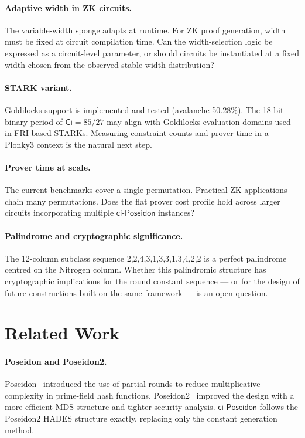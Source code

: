 \documentclass[preprint]{iacrtrans}
\newcommand{\Ci}{\ensuremath{\mathsf{Ci}}}
\newcommand{\ciposeidon}{\ensuremath{\mathsf{ci\text{-}Poseidon}}}
\begin{document}
\paragraph{Adaptive width in ZK circuits.}
The variable-width sponge adapts at runtime. For ZK proof generation, width
must be fixed at circuit compilation time. Can the width-selection logic be
expressed as a circuit-level parameter, or should circuits be instantiated
at a fixed width chosen from the observed stable width distribution?

\paragraph{STARK variant.}
Goldilocks support is implemented and tested (avalanche 50.28\%). The 18-bit
binary period of $\Ci = 85/27$ may align with Goldilocks evaluation domains
used in FRI-based STARKs. Measuring constraint counts and prover time in a
Plonky3 context is the natural next step.

\paragraph{Prover time at scale.}
The current benchmarks cover a single permutation. Practical ZK applications
chain many permutations. Does the flat prover cost profile hold across larger
circuits incorporating multiple \ciposeidon{} instances?

\paragraph{Palindrome and cryptographic significance.}
The 12-column subclass sequence 2,2,4,3,1,3,3,1,3,4,2,2 is a perfect
palindrome centred on the Nitrogen column. Whether this palindromic structure
has cryptographic implications for the round constant sequence — or for the
design of future constructions built on the same framework — is an open
question.

\section{Related Work}

\paragraph{Poseidon and Poseidon2.}
Poseidon~\cite{GKR+21} introduced the use of partial rounds to reduce
multiplicative complexity in prime-field hash functions. Poseidon2~\cite{GKRRS23}
improved the design with a more efficient MDS structure and tighter security
analysis. \ciposeidon{} follows the Poseidon2 HADES structure exactly,
replacing only the constant generation method.
\end{document}
